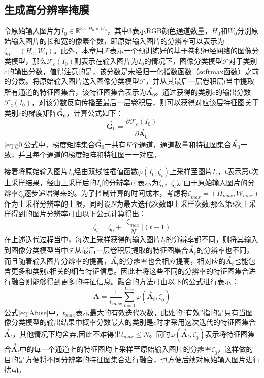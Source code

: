 \subsection{生成高分辨率掩膜}
令原始输入图片为$I_0 \in \mathbb{R}^{3\times H_0 \times W_0}$，其中3表示RGB颜色通道数量，$H_0$和$W_0$分别原始输入图片的长和宽的像素个数，即原始输入图片的分辨率可以表示为$\zeta_0=(H_0,W_0)$。此外，本章用$\mathcal{F}$表示一个预训练好的基于卷积神经网络的图像分类模型，那么$\mathcal{F}_c(I_0)$则表示在输入图片为$I_0$的情况下，图像分类模型$\mathcal{F}$对于类别$c$的输出分数，值得注意的是，该分数是未经归一化指数函数（softmax函数）之前的分数。将原始输入图片送入图像分类模型$\mathcal{F}$，并从其最后一层卷积层$l$当中提取所有通道的特征图集合，该特征图集合表示为$\overset{*}{\boldsymbol{A}_0}$。通过获得的类别$c$的输出分数$\mathcal{F}_c(I_0)$，对该分数反向传播至最后一层卷积层，则可以获得对应该层特征图关于类别$c$的梯度矩阵$\overset{*}{\boldsymbol{G}_0}$，计算公式如下：
\begin{equation}
\overset{*}{\boldsymbol{G}_0}=\frac{\partial \mathcal{F}_c(I_0)}{\partial \overset{*}{\boldsymbol{A}_0}}
\label{eq:g0}
\end{equation}
\ref{eq:g0}公式中，梯度矩阵集合$\overset{*}{\boldsymbol{G}_0}$一共有$K$个通道，通道数量和特征图集合$\overset{*}{\boldsymbol{A}_0}$一致，并且每个通道的梯度矩阵和特征图一一对应。 

接着将原始输入图片$I_0$经由双线性插值函数$\varphi(I_0,\zeta_t)$上采样至图片$I_t$，$t$表示第$t$次上采样结果，经由上采样后的$I_t$的分辨率可表示为$\zeta_t$，$\zeta_t$是由于原始输入图片的分辨率$\zeta_0$逐步递增得来的。为了控制计算的时间成本，考虑将$\zeta_{max}=(H_{max},W_{max})$作为上采样分辨率的上限，同时设$N$为最大迭代次数即上采样次数,那么第$t$次上采样得到的图片分辨率可由以下公式计算得出：
\begin{equation}
	\zeta_t=\zeta_0 +\lfloor\frac{\zeta_{max}}{N}\rfloor(t-1)
\end{equation}
在上述迭代过程当中，每次上采样获得的输入图片$I_t$的分辨率都不同，则将其输入到图像分类模型当中$\mathcal{F}$从最后一层卷积层提取的特征图集合$\overset{*}{\boldsymbol{A}_t}$的分辨率也不同，而且随着输入图片分辨率的提高，$\overset{*}{\boldsymbol{A}_t}$的分辨率也会相应提高，相对应的$\overset{*}{\boldsymbol{A}_t}$也能包含更多和类别$c$相关的细节特征信息。因此若将这些不同的分辨率的特征图集合进行融合则能够得到更多的特征信息。融合的方法可由以下的公式进行表示：
\begin{equation}
	\overline{\bm{A}}=\frac{1}{t_{max}}\sum_{t=0}^{t_{max}}\varphi(\overset{*}{\boldsymbol{A}_t},\zeta_0)
	\label{eq:Afuse}
\end{equation}
公式\ref{eq:Afuse}中，$t_{max}$表示最大的有效迭代次数，此处的“有效”指的是只有当图像分类模型的输出结果中概率分数最大的类别是$c$时才采用这次迭代的特征图集合$\overset{*}{\boldsymbol{A}_t}$，其他情况下均舍弃,因此不难得出$t_{max} \leq N$。同时$\varphi(\overset{*}{\boldsymbol{A}_t},\zeta_0)$表示将特征图集合$\overset{*}{\boldsymbol{A}_t}$中的每一个通道上的特征图均上采样至原始输入图片的分辨率$\zeta_0$，这样做的目的是方便将不同分辨率的特征图集合进行融合，也方便后续对原始输入图片进行扰动。

